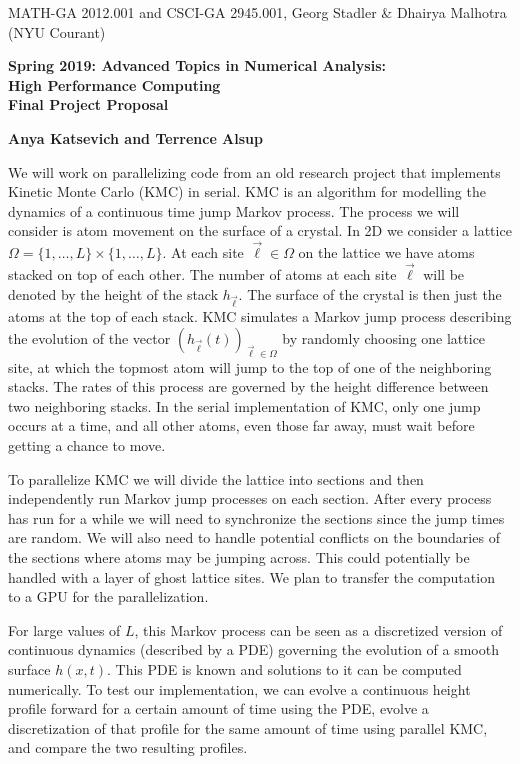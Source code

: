 \documentclass[12pt]{article}
\begin{document}
\begin{center}
  \vspace*{-2cm}
{\small MATH-GA 2012.001 and CSCI-GA 2945.001, Georg Stadler \&
  Dhairya Malhotra (NYU Courant)}
\end{center}
\vspace*{.5cm}
\begin{center}
\large \textbf{%
Spring 2019: Advanced Topics in Numerical Analysis: \\
High Performance Computing \\
Final Project Proposal }
\end{center}

\vspace*{0.4cm}
\begin{center}
\large \textbf{Anya Katsevich and Terrence Alsup}
\end{center}

\par We will work on parallelizing code from an old research project that implements Kinetic Monte Carlo (KMC) in serial.  KMC is an algorithm for modelling the dynamics of a continuous time jump Markov process. The process we will consider is atom movement on the surface of a crystal.  In 2D we consider a lattice $\Omega = \{1,\ldots,L\} \times \{1,\ldots,L\}$.  At each site $\vec{\ell} \in \Omega$ on the lattice we have atoms stacked on top of each other.  The number of atoms at each site $\vec{\ell}$ will be denoted by the height of the stack $h_{\vec{\ell}}$.  The surface of the crystal is then just the atoms at the top of each stack.  KMC simulates a Markov jump process describing the evolution of the vector $(h_{\vec{\ell}}(t))_{\vec{\ell} \in \Omega}$ by randomly choosing one lattice site, at which the topmost atom will jump to the top of one of the neighboring stacks. The rates of this process are governed by the height difference between two neighboring stacks.  In the serial implementation of KMC, only one jump occurs at a time, and all other atoms, even those far away, must wait before getting a chance to move. \\

\par To parallelize KMC we will divide the lattice into sections and then independently run Markov jump processes on each section.  After every process has run for a while we will need to synchronize the sections since the jump times are random.  We will also need to handle potential conflicts on the boundaries of the sections where atoms may be jumping across.  This could potentially be handled with a layer of ghost lattice sites.  We plan to transfer the computation to a GPU for the parallelization.  \\

\par For large values of $L$, this Markov process can be seen as a discretized version of continuous dynamics (described by a PDE) governing the evolution of a smooth surface $h(x, t)$. This PDE is known and solutions to it can be computed numerically. To test our implementation, we can evolve a continuous height profile forward for a certain amount of time using the PDE, evolve a discretization of that profile for the same amount of time using parallel KMC, and compare the two resulting profiles. 
\end{document}
